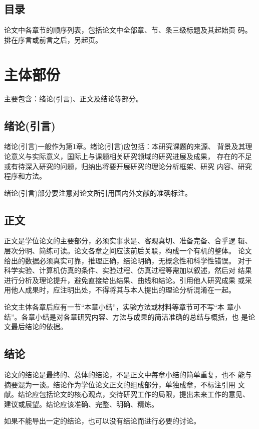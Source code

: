 \subsection{目录}
论文中各章节的顺序列表，包括论文中全部章、节、条三级标题及其起始页
码。排在序言或前言之后，另起页。 

\section{主体部份}
主要包含：绪论(引言)、正文及结论等部分。


\subsection{绪论(引言)}
绪论(引言)一般作为第1章。绪论(引言)应包括：本研究课题的来源、
背景及其理论意义与实际意义，国际上与课题相关研究领域的研究进展及成果，
存在的不足或有待深入研究的问题，归纳出将要开展研究的理论分析框架、研究
内容、研究程序和方法。 

绪论(引言)部分要注意对论文所引用国内外文献的准确标注\cite{BeiJingJiao2014BeiJingJiaoTongDaXueBoShiShuoShiXueWeiLunWen}。

\subsection{正文}
正文是学位论文的主要部分，必须实事求是、客观真切、准备完备、合乎逻
辑、层次分明、简练可读。论文各章之间应该前后关联，构成一个有机的整体。
论文给出的数据必须真实可靠，推理正确，结论明确，无概念性和科学性错误。
对于科学实验、计算机仿真的条件、实验过程、仿真过程等需加以叙述，然后对
结果进行分析及理论提升，避免直接给出结果、曲线和结论。引用他人研究成果
或采用他人成果时，应注明出处，不得将其与本人提出的理论分析混淆在一起。

论文主体各章后应有一节“本章小结”，实验方法或材料等章节可不写“本
章小结”。各章小结是对各章研究内容、方法与成果的简洁准确的总结与概括，也
是论文最后结论的依据。

\subsection{结论}
论文的结论是最终的、总体的结论，不是正文中每章小结的简单重复，也不
能与摘要混为一谈。结论作为学位论文正文的组成部分，单独成章，不标注引用
文献。结论应包括论文的核心观点，交待研究工作的局限，提出未来工作的意见、
建议或展望。结论应该准确、完整、明确、精炼。 

如果不能导出一定的结论，也可以没有结论而进行必要的讨论。


